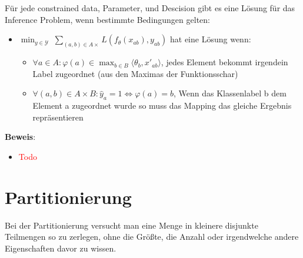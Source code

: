 \documentclass[12pt,a4paper]{article}
\newcommand{\red}[1]{\textcolor{red} {#1}}
\begin{document}
Für jede constrained data, Parameter, und Descision gibt es eine Lösung für das Inference Problem, wenn bestimmte Bedingungen gelten:
\begin{itemize}
\item $\displaystyle \min_{y\in \mathcal{Y}} \; \sum_{(a,b)\in A\times}  L(f_\theta(x_{ab}),y_{ab})$ hat eine Lösung wenn:
\begin{itemize}
\item $\displaystyle \forall a \in A: \varphi(a) \in \max_{b\in B} \langle \theta_b,x'_{ab} \rangle$, jedes Element bekommt irgendein Label zugeordnet (aus den Maximas der Funktionsschar)
\item $\forall (a,b)\in A \times B: \hat{y}_{a} = 1 \Leftrightarrow \varphi(a) = b$, Wenn das Klassenlabel b dem Element a zugeordnet wurde so muss das Mapping das gleiche Ergebnis repräsentieren
\end{itemize}
\end{itemize}
\textbf{Beweis}:
\begin{itemize}
\item \red{Todo}
\end{itemize}

\section{Partitionierung}
Bei der Partitionierung versucht man eine Menge in kleinere disjunkte Teilmengen so zu zerlegen, ohne die Größte, die Anzahl oder irgendwelche andere Eigenschaften davor zu wissen.
\end{document}
